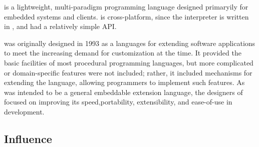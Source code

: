 \documentclass[../Languages.tex]{subfiles}
\begin{document}
\label{sec:lua}

 is a lightweight, multi-paradigm programming language designed
primaryily for embedded systems and clients.  is cross-platform, since
the interpreter is written in , and had a relatively simple  API.

 was originally designed in 1993 as a languages for extending software
applications to meet the increasing demand for customization at the time. It
provided the basic facilities of most procedural programming languages, but
more complicated or domain-specific features were not included; rather, it
included mechanisms for extending the language, allowing programmers to
implement such features. As  was intended to be a general embeddable
extension language, the designers of  focused on improving its
speed,portability, extensibility, and ease-of-use in development.

\subsection{Influence}\label{sub:influence}
\end{document}
